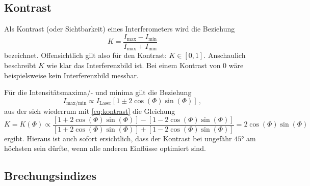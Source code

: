 \subsection{Kontrast} \label{sec:kontrast}
Als Kontrast (oder Sichtbarkeit) eines Interferometers wird die Beziehung
\begin{equation} \label{eq:kontrast}
    K = \frac{I_\text{max} - I_\text{min}}{I_\text{max} + I_\text{min}}
\end{equation}
bezeichnet. Offensichtlich gilt also für den Kontrast: $K \in [0,1]$.
Anschaulich beschreibt $K$ wie klar das Interferenzbild ist.
Bei einem Kontrast von $0$ wäre beispielsweise kein Interferenzbild messbar.

Für die Intensitätsmaxima/- und minima gilt die Beziehung \cite{v64}
\begin{equation*}
    I_\text{max/min} \propto I_\text{Laser} \left[ 1 \pm 2 \cos(\Phi) \sin (\Phi) \right] \, ,
\end{equation*}
aus der sich wiederrum mit \autoref{eq:kontrast} die Gleichung
\begin{equation*}
    K = K(\Phi) \propto \frac{\left[ 1 + 2 \cos(\Phi) \sin (\Phi) \right] - \left[ 1 - 2 \cos(\Phi) \sin (\Phi) \right]}{\left[ 1 + 2 \cos(\Phi) \sin (\Phi) \right] + \left[ 1 - 2 \cos(\Phi) \sin (\Phi) \right]}
    = 2 \cos(\Phi) \sin(\Phi)
\end{equation*}
ergibt. Hieraus ist auch sofort ersichtlich, dass der Kontrast bei ungefähr $45°$ am höchsten sein dürfte, wenn alle anderen Einflüsse optimiert sind.

\subsection{Brechungsindizes} \label{sec:n}

